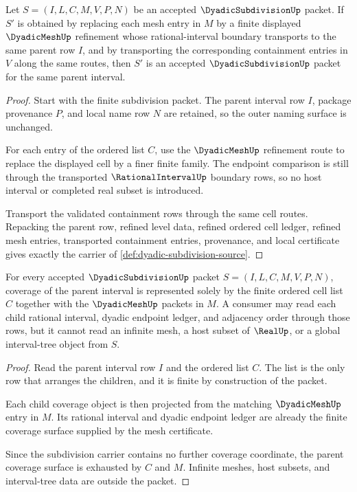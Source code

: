 \begin{theorem}
\label{thm:dyadic-subdivision-refinement-stability}
Let $S=(I,L,C,M,V,P,N)$ be an accepted $\DyadicSubdivisionUp$ packet. If $S'$ is obtained by replacing each mesh entry in $M$ by a finite displayed $\DyadicMeshUp$ refinement whose rational-interval boundary transports to the same parent row $I$, and by transporting the corresponding containment entries in $V$ along the same routes, then $S'$ is an accepted $\DyadicSubdivisionUp$ packet for the same parent interval.
\end{theorem}
\begin{proof}
Start with the finite subdivision packet. The parent interval row $I$, package provenance $P$, and local name row $N$ are retained, so the outer naming surface is unchanged.

For each entry of the ordered list $C$, use the $\DyadicMeshUp$ refinement route to replace the displayed cell by a finer finite family. The endpoint comparison is still through the transported $\RationalIntervalUp$ boundary rows, so no host interval or completed real subset is introduced.

Transport the validated containment rows through the same cell routes. Repacking the parent row, refined level data, refined ordered cell ledger, refined mesh entries, transported containment entries, provenance, and local certificate gives exactly the carrier of \autoref{def:dyadic-subdivision-source}.
\end{proof}

\begin{theorem}
\label{thm:dyadic-subdivision-mesh-coverage}
For every accepted $\DyadicSubdivisionUp$ packet $S=(I,L,C,M,V,P,N)$, coverage of the parent interval is represented solely by the finite ordered cell list $C$ together with the $\DyadicMeshUp$ packets in $M$. A consumer may read each child rational interval, dyadic endpoint ledger, and adjacency order through those rows, but it cannot read an infinite mesh, a host subset of $\RealUp$, or a global interval-tree object from $S$.
\end{theorem}
\begin{proof}
Read the parent interval row $I$ and the ordered list $C$. The list is the only row that arranges the children, and it is finite by construction of the packet.

Each child coverage object is then projected from the matching $\DyadicMeshUp$ entry in $M$. Its rational interval and dyadic endpoint ledger are already the finite coverage surface supplied by the mesh certificate.

Since the subdivision carrier contains no further coverage coordinate, the parent coverage surface is exhausted by $C$ and $M$. Infinite meshes, host subsets, and interval-tree data are outside the packet.
\end{proof}

